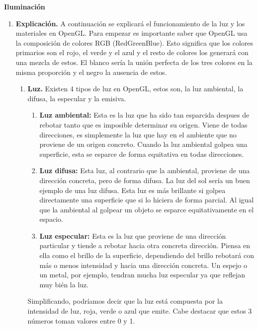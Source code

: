 \documentclass[12pt,a4paper]{article}
\begin{document}
\item \textbf{Iluminación}
\begin{enumerate}
\item \textbf{Explicación.}
A continuación se explicará el funcionamiento de la luz y los materiales en OpenGL. Para empezar es importante saber que OpenGL usa la composición de colores RGB (RedGreenBlue). Esto significa que los colores primarios son el rojo, el verde y el azul y el resto de colores los generará con una mezcla de estos. El blanco sería la unión perfecta de los tres colores en la misma proporción y el negro la ausencia de estos.\newline
\begin{enumerate}
\item \textbf{Luz.}
Existen 4 tipos de luz en OpenGL, estos son, la luz ambiental, la difusa, la especular y la emisiva.
\begin{enumerate}
\item\textbf{Luz ambiental:}
Esta es la luz que ha sido tan esparcida despues de rebotar tanto que es imposible determinar su origen. Viene de todas direcciones, es simplemente la luz que hay en el ambiente que no proviene de un origen concreto.\newline
Cuando la luz ambiental golpea una superficie, esta se esparce de forma equitativa en todas direcciones.
\item\textbf{Luz difusa:}
Esta luz, al contrario que la ambiental, proviene de una dirección concreta, pero de forma difusa. La luz del sol sería un buen ejemplo de una luz difusa.\newline
Esta luz es más brillante si golpea directamente una superficie que si lo hiciera de forma parcial. Al igual que la ambiental al golpear un objeto se esparce equitativamente en el espacio.
\item\textbf{Luz especular:}
Esta es la luz que proviene de una dirección particular y tiende a rebotar hacia otra concreta dirección. Piensa en ella como el brillo de la superficie, dependiendo del brillo rebotará con más o menos intensidad y hacia una dirección concreta. Un espejo o un metal, por ejemplo, tendran mucha luz especular ya que reflejan muy bién la luz.
\end{enumerate}
Simplificando, podríamos decir que la luz está compuesta por la intensidad de luz, roja, verde o azul que emite. Cabe destacar que estos 3 números toman valores entre 0 y 1.


\end{enumerate}
\end{enumerate}
\end{document}

